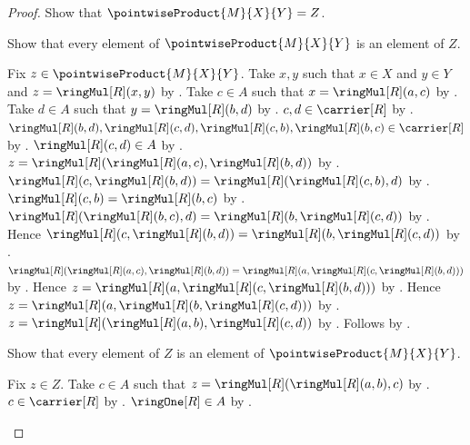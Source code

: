 \begin{proof}
    Show that $\pointwiseProduct{M}{X}{Y}=Z$.
    \begin{subproof}
        Show that every element of $\pointwiseProduct{M}{X}{Y}$ is an
            element of $Z$.
        \begin{subproof}
            Fix $z\in\pointwiseProduct{M}{X}{Y}$.
            Take $x,y$ such that $x\in X$ and $y\in Y$ and
                $z=\ringMul[R](x,y)$ by
                .
            Take $c\in A$ such that $x=\ringMul[R](a,c)$ by
                .
            Take $d\in A$ such that $y=\ringMul[R](b,d)$ by
                .
            $c,d\in\carrier[R]$ by .
            $\ringMul[R](b,d),\ringMul[R](c,d),
                \ringMul[R](c,b),\ringMul[R](b,c)\in\carrier[R]$ by
                .
            $\ringMul[R](c,d)\in A$ by .
            $z=\ringMul[R](
                \ringMul[R](a,c),\ringMul[R](b,d))$ by \auto.
            $\ringMul[R](c,\ringMul[R](b,d))
                =\ringMul[R](\ringMul[R](c,b),d)$ by
                .
            $\ringMul[R](c,b)=\ringMul[R](b,c)$ by
                .
            $\ringMul[R](\ringMul[R](b,c),d)
                =\ringMul[R](b,\ringMul[R](c,d))$ by
                .
            Hence $\ringMul[R](c,\ringMul[R](b,d))
                =\ringMul[R](b,\ringMul[R](c,d))$ by \auto.
            $\ringMul[R](\ringMul[R](a,c),\ringMul[R](b,d))
                =\ringMul[R](a,\ringMul[R](c,\ringMul[R](b,d)))$ by
                .
            Hence $z=\ringMul[R](a,
                \ringMul[R](c,\ringMul[R](b,d)))$ by \auto.
            Hence $z=\ringMul[R](a,
                \ringMul[R](b,\ringMul[R](c,d)))$ by \auto.
            $z=\ringMul[R](\ringMul[R](a,b),\ringMul[R](c,d))$ by
                .
            Follows by
                .
        \end{subproof}
        Show that every element of $Z$ is an element of
            $\pointwiseProduct{M}{X}{Y}$.
        \begin{subproof}
            Fix $z\in Z$.
            Take $c\in A$ such that
                $z=\ringMul[R](\ringMul[R](a,b),c)$ by
                .
            $c\in\carrier[R]$ by .
            $\ringOne[R]\in A$ by .

\end{subproof}
\end{subproof}
\end{proof}
